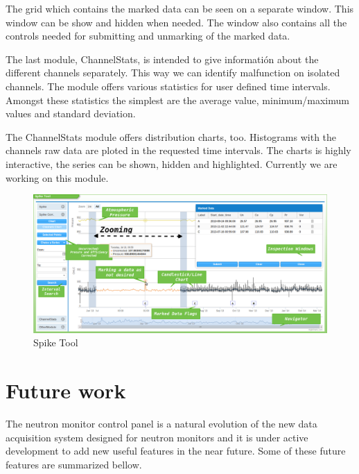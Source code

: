 \documentclass[a4paper]{jpconf}
\begin{document}
The grid which contains the marked data can be seen on a separate window. This
window can be show and hidden when needed. The window also contains all the
controls needed for submitting and unmarking of the marked data.

The last module, ChannelStats, is intended to give informatión about the
different channels separately. This way we can identify malfunction on isolated
channels. The module offers various statistics for user defined time intervals.
Amongst these statistics the simplest are the average value, minimum/maximum
values and standard deviation.

The ChannelStats module offers distribution charts, too. Histograms with the
channels raw data are ploted in the requested time intervals. The charts is
highly interactive, the series can be shown, hidden and highlighted. Currently
we are working on this module.

\begin{figure}[h]
    \centering
    \includegraphics[keepaspectratio, width=1\textwidth]{./resources/SpikeTool.png}
    \caption{Spike Tool}
    \label{fig:arch}
\end{figure}

\section{Future work}

The neutron monitor control panel is a natural evolution of the new data
acquisition system designed for neutron monitors and it is under active
development to add new useful features in the near future. Some of these future
features are summarized bellow.
\end{document}

